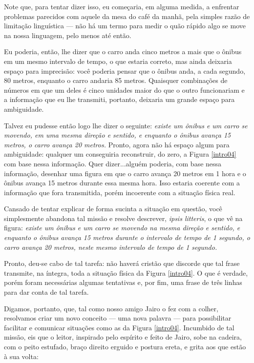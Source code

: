 Note que, para tentar dizer isso, eu começaria, em alguma medida, a enfrentar problemas parecidos com aquele da mesa do café da manhã, pela simples razão de limitação linguística --- não há um termo para medir o quão rápido algo se move na nossa linguagem, pelo menos até então. 

Eu poderia, então, lhe dizer que o carro anda cinco metros a mais que o ônibus em um mesmo intervalo de tempo, o que estaria correto, mas ainda deixaria espaço para imprecisão: você poderia pensar que o ônibus anda, a cada segundo, 80 metros, enquanto o carro andaria 85 metros. Quaisquer combinações de números em que um deles é cinco unidades maior do que o outro funcionariam e a informação que eu lhe transmiti, portanto, deixaria um grande espaço para ambiguidade. 

Talvez eu pudesse então logo lhe dizer o seguinte: \textit{existe um ônibus e um carro se movendo, em uma mesma direção e sentido, e enquanto o ônibus avança 15 metros, o carro avança 20 metros.} Pronto, agora não há espaço algum para ambiguidade: qualquer um conseguiria reconstruir, do zero, a Figura \ref{intro04} com base nessa informação. Quer dizer...alguém poderia, com base nessa informação, desenhar uma figura em que o carro avança 20 metros em 1 hora e o ônibus avança 15 metros durante essa mesma hora. Isso estaria coerente com a informação que fora transmitida, porém incoerente com a situação física real. 

Cansado de tentar explicar de forma sucinta a situação em questão, você simplesmente abandona tal missão e resolve descrever, \textit{ipsis litteris}, o que vê na figura: \textit{existe um ônibus e um carro se movendo na mesma direção e sentido, e enquanto o ônibus avança 15 metros durante o intervalo de tempo de 1 segundo, o carro avança 20 metros, neste mesmo intervalo de tempo de 1 segundo.}

Pronto, deu-se cabo de tal tarefa: não haverá cristão que discorde que tal frase transmite, na íntegra, toda a situação física da Figura \ref{intro04}. O que é verdade, porém foram necessárias algumas tentativas e, por fim, uma frase de três linhas para dar conta de tal tarefa.

Digamos, portanto, que, tal como nosso amigo Jairo o fez com a colher, resolvamos criar um novo conceito --- uma nova palavra --- para possibilitar facilitar e comunicar situações como as da Figura \ref{intro04}. Incumbido de tal missão, eis que o leitor, inspirado pelo espírito e feito de Jairo, sobe na cadeira, com o peito estufado, braço direito erguido e postura ereta, e grita aos que estão à sua volta:

